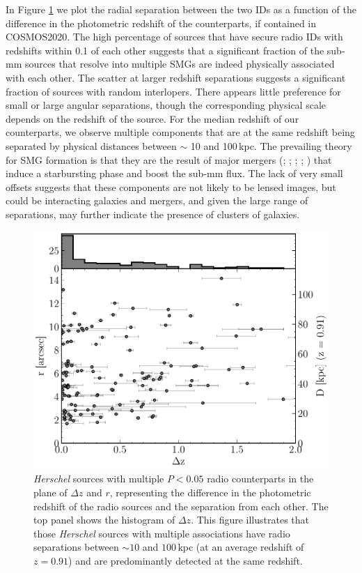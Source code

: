 In Figure \ref{fig:multiples_separation} we plot the radial separation between the two IDs as a function of the difference in the photometric redshift of the counterparts, if contained in COSMOS2020. The high percentage of sources that have secure radio IDs with redshifts within 0.1 of each other suggests that a significant fraction of the sub-mm sources that resolve into multiple SMGs are indeed physically associated with each other. The scatter at larger redshift separations suggests a significant fraction of sources with random interlopers. There appears little preference for small or large angular separations, though the corresponding physical scale depends on the redshift of the source. For the median redshift of our counterparts, we observe multiple components that are at the same redshift being separated by physical distances between $\sim$ 10 and 100\,kpc. The prevailing theory for SMG formation is that they are the result of major mergers (\citealt{Ivison_2002}; \citealt{Smail_2004}; \citealt{Ivison_2007}; \citealt{Engel_2010}; \citealt{Hayward_2011}) that induce a starbursting phase and boost the sub-mm flux. The lack of very small offsets suggests that these components are not likely to be lensed images, but could be interacting galaxies and mergers, and given the large range of separations, may further indicate the presence of clusters of galaxies.

\begin{figure}
	\centering
	\includegraphics[width=0.75\columnwidth]{Figures/multiples_separation.pdf}
	\caption[Physical separation between multiple radio IDs to a given source]{\textit{Herschel} sources with multiple $P < 0.05$ radio counterparts in the plane of $\Delta z$ and $r$, representing the difference in the photometric redshift of the radio sources and the separation from each other. The top panel shows the histogram of $\Delta z$. This figure illustrates that those \textit{Herschel} sources with multiple associations have radio separations between $\sim 10$ and $100\,$kpc (at an average redshift of $z = 0.91$) and are predominantly detected at the same redshift.}
	\label{fig:multiples_separation}
\end{figure}

